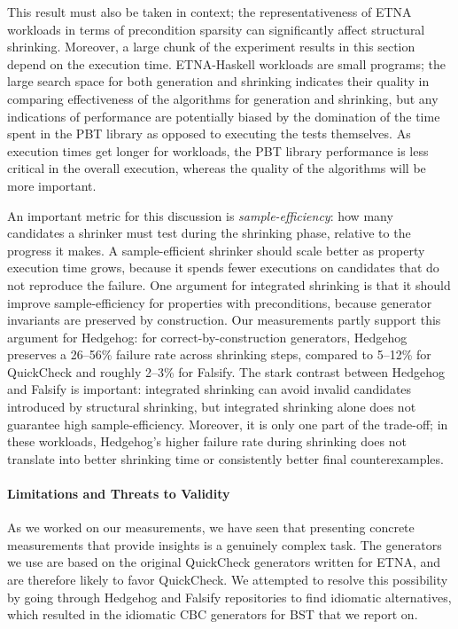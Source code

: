 This result must also be taken in context; the representativeness of ETNA workloads in
terms of precondition sparsity can significantly affect structural shrinking.
%
Moreover, a large chunk of the experiment results in this section depend on the
execution time. ETNA-Haskell workloads are small programs; the large search space for
both generation and shrinking indicates their quality in comparing effectiveness of the
algorithms for generation and shrinking, but any indications of performance are
potentially biased by the domination of the time spent in the PBT library as opposed to
executing the tests themselves. As execution times get longer for workloads, the PBT
library performance is less critical in the overall execution, whereas the quality of
the algorithms will be more important.

An important metric for this discussion is \emph{sample-efficiency}: how many
candidates a shrinker must test during the shrinking phase, relative to the progress it
makes. A sample-efficient shrinker should scale better as property execution time
grows, because it spends fewer executions on candidates that do not reproduce the
failure. One argument for integrated shrinking is that it should improve
sample-efficiency for properties with preconditions, because generator invariants are
preserved by construction. Our measurements partly support this argument for Hedgehog:
for correct-by-construction generators, Hedgehog preserves a 26--56\% failure rate
across shrinking steps, compared to 5--12\% for QuickCheck and roughly 2--3\% for
Falsify. The stark contrast between Hedgehog and Falsify is important: integrated
shrinking can avoid invalid candidates introduced by structural shrinking, but
integrated shrinking alone does not guarantee high sample-efficiency. Moreover, it is
only one part of the trade-off; in these workloads, Hedgehog's higher failure rate
during shrinking does not translate into better shrinking time or consistently better
final counterexamples.

\paragraph*{Limitations and Threats to Validity}\label{shrinkeval:threats}

As we worked on our measurements, we have seen that presenting concrete measurements
that provide insights is a genuinely complex task. The generators we use are based on
the original QuickCheck generators written for ETNA, and are therefore likely to favor
QuickCheck. We attempted to resolve this possibility by going through Hedgehog and
Falsify repositories to find idiomatic alternatives, which resulted in the idiomatic
CBC generators for BST that we report on.

